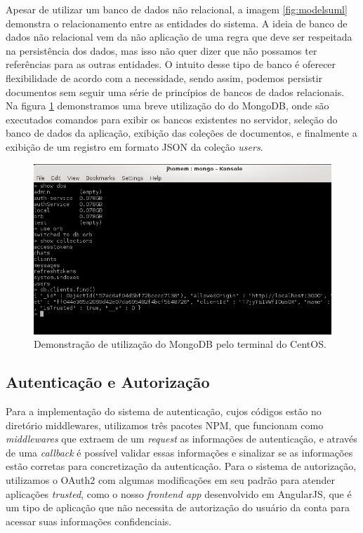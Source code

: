 Apesar de utilizar um banco de dados não relacional, a imagem \ref{fig:modelsuml} demonstra o relacionamento entre as entidades do sistema. A ideia de banco de dados não relacional vem da não aplicação de uma regra que deve ser respeitada na persistência dos dados, mas isso não quer dizer que não possamos ter referências para as outras entidades. O intuito desse tipo de banco é oferecer flexibilidade de acordo com a necessidade, sendo assim, podemos persistir documentos sem seguir uma série de princípios de bancos de dados relacionais. Na figura \ref{fig:mongoconsole} demonstramos uma breve utilização do do MongoDB, onde são executados comandos para exibir os bancos existentes no servidor, seleção do banco de dados da aplicação, exibição das coleções de documentos, e finalmente a exibição de um registro em formato JSON da coleção \textit{users}.  

\begin{figure}[!h]
	\centering
	\includegraphics[scale=0.75]{imagens/mongo_console.png}
	\caption{\small Demonstração de utilização do MongoDB pelo terminal do CentOS.}
	\label{fig:mongoconsole}
\end{figure}


\subsection{Autenticação e Autorização}
Para a implementação do sistema de autenticação, cujos códigos estão no diretório middlewares, utilizamos três pacotes NPM, que funcionam como \textit{middlewares} que extraem de um \textit{request} as informações de autenticação, e através de uma \textit{callback} é possível validar essas informações e sinalizar se as informações estão corretas para concretização da autenticação. Para o sistema de autorização, utilizamos o OAuth2 com algumas modificações em seu padrão para atender aplicações \textit{trusted}, como o nosso \textit{frontend app} desenvolvido em AngularJS, que é um tipo de aplicação que não necessita de autorização do usuário da conta para acessar suas informações confidenciais.

